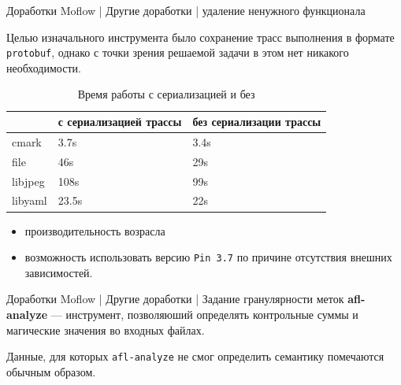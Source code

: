 \documentclass[10pt]{beamer}
\begin{document}
\begin{frame}{Доработки Moflow | Другие доработки | удаление ненужного функционала}

Целью изначального инструмента было сохранение трасс выполнения в формате \texttt{protobuf}, однако с точки зрения решаемой задачи в этом нет никакого необходимости.
\pause
\begin{table}[H]
    \centering
    \caption{Время работы с сериализацией и без} \label{tab:compare2}
    \begin{tabular}[]{@{}lll@{}}
    \toprule
    & с сериализацией трассы & без сериализации трассы  \tabularnewline
    \midrule
    cmark & 3.7s & 3.4s \tabularnewline
    file & 46s & 29s \tabularnewline
    libjpeg & 108s & 99s \tabularnewline
    libyaml & 23.5s & 22s \tabularnewline
    \bottomrule
\end{tabular}
\end{table}
\pause
\begin{itemize}
\item производительность возрасла
\item возможность использовать версию \texttt{Pin 3.7} по причине отсутствия внешних зависимостей.
  \end{itemize}

\end{frame}

\begin{frame}{Доработки Moflow | Другие доработки | Задание гранулярности меток}
\textbf{afl-analyze} --- инструмент, позволяюший определять контрольные суммы и магические значения во входных файлах.
\pause
\begin{figure}[H]
\end{figure}
Данные, для которых \texttt{afl-analyze} не смог определить семантику помечаются обычным образом.
\end{frame}
\end{document}
